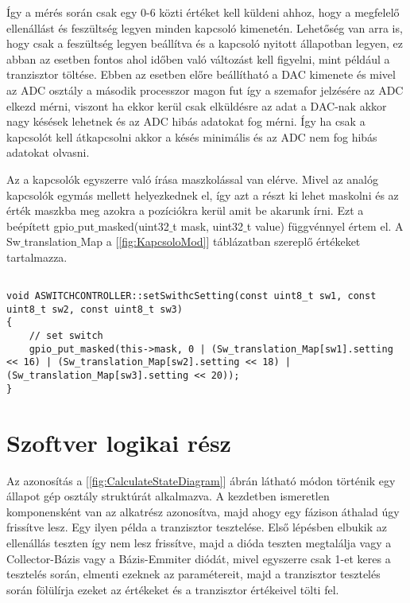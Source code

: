 Így a mérés során csak egy 0-6 közti értéket kell küldeni 
ahhoz, hogy a megfelelő ellenállást és feszültség legyen
minden kapcsoló kimenetén. Lehetőség van arra is, hogy csak 
a feszültség legyen beállítva és a kapcsoló nyitott állapotban legyen,
ez abban az esetben fontos ahol időben való változást kell figyelni,
mint például a tranzisztor töltése. Ebben az esetben előre 
beállítható a DAC kimenete és mivel az ADC osztály a második
processzor magon fut így a szemafor jelzésére az ADC elkezd mérni, 
viszont ha ekkor kerül csak elküldésre az adat a DAC-nak akkor 
nagy késések lehetnek és az ADC hibás adatokat fog mérni.
Így ha csak a kapcsolót kell átkapcsolni akkor a késés minimális és az ADC
nem fog hibás adatokat olvasni.

Az a kapcsolók egyszerre való írása maszkolással van elérve. Mivel az 
analóg kapcsolók egymás mellett helyezkednek el, így azt a 
részt ki lehet maskolni és az érték maszkba meg azokra a pozíciókra
kerül amit be akarunk írni. Ezt a beépített gpio$\_$put$\_$masked(uint32$\_$t mask, uint32$\_$t value)
függvénnyel értem el. A Sw$\_$translation$\_$Map a [\ref{fig:KapcsoloMod}] táblázatban
szereplő értékeket tartalmazza.


\begin{lstlisting}

void ASWITCHCONTROLLER::setSwithcSetting(const uint8_t sw1, const uint8_t sw2, const uint8_t sw3)
{
    // set switch
    gpio_put_masked(this->mask, 0 | (Sw_translation_Map[sw1].setting << 16) | (Sw_translation_Map[sw2].setting << 18) | (Sw_translation_Map[sw3].setting << 20));
}

\end{lstlisting}


\section{Szoftver logikai rész}

Az azonosítás a [\ref{fig:CalculateStateDiagram}] ábrán látható
módon történik egy állapot gép osztály struktúrát alkalmazva.
A kezdetben ismeretlen komponensként van az alkatrész azonosítva,
majd ahogy egy fázison áthalad úgy frissítve lesz. 
Egy ilyen példa a tranzisztor tesztelése. Első lépésben elbukik az 
ellenállás teszten így nem lesz frissítve, majd a dióda teszten
megtalálja vagy a Collector-Bázis vagy a Bázis-Emmiter diódát, 
mivel egyszerre csak 1-et keres a tesztelés során, elmenti ezeknek az 
paramétereit, majd a tranzisztor tesztelés során fölülírja ezeket az értékeket 
és a tranzisztor értékeivel tölti fel.


